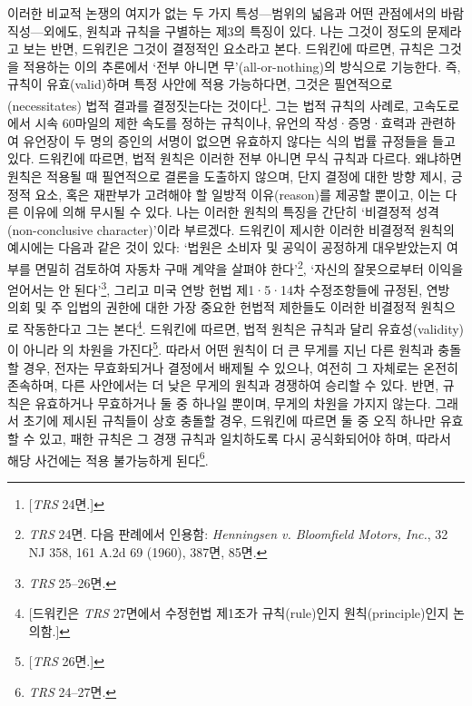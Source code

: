 이러한 비교적 논쟁의 여지가 없는 두 가지 특성---범위의 넓음과 어떤
관점에서의 바람직성---외에도, 원칙과 규칙을 구별하는 제3의 특징이 있다.
나는 그것이 정도의 문제라고 보는 반면, 드워킨은 그것이 결정적인 요소라고
본다. 드워킨에 따르면, 규칙은 그것을 적용하는 이의 추론에서 `전부 아니면
무'(all-or-nothing)의 방식으로 기능한다. 즉, 규칙이 유효(valid)하며 특정
사안에 적용 가능하다면, 그것은 필연적으로(necessitates) 법적 결과를
결정짓는다는 것이다\footnote{{[}\emph{TRS} 24면.{]}}. 그는 법적 규칙의
사례로, 고속도로에서 시속 60마일의 제한 속도를 정하는 규칙이나, 유언의
작성·증명·효력과 관련하여 유언장이 두 명의 증인의 서명이 없으면 유효하지
않다는 식의 법률 규정들을 들고 있다. 드워킨에 따르면, 법적 원칙은 이러한
전부 아니면 무식 규칙과 다르다. 왜냐하면 원칙은 적용될 때 필연적으로
결론을 도출하지 않으며, 단지 결정에 대한 방향 제시, 긍정적 요소, 혹은
재판부가 고려해야 할 일방적 이유(reason)를 제공할 뿐이고, 이는 다른
이유에 의해 무시될 수 있다. 나는 이러한 원칙의 특징을 간단히 `비결정적
성격(non-conclusive character)'이라 부르겠다. 드워킨이 제시한 이러한
비결정적 원칙의 예시에는 다음과 같은 것이 있다: `법원은 소비자 및 공익이
공정하게 대우받았는지 여부를 면밀히 검토하여 자동차 구매 계약을 살펴야
한다'\footnote{\emph{TRS} 24면. 다음 판례에서 인용함: \emph{Henningsen
  v. Bloomfield Motors, Inc.}, 32 NJ 358, 161 A.2d 69 (1960), 387면,
  85면.}, `자신의 잘못으로부터 이익을 얻어서는 안 된다'\footnote{\emph{TRS}
  25--26면.}, 그리고 미국 연방 헌법 제1·5·14차 수정조항들에 규정된, 연방
의회 및 주 입법의 권한에 대한 가장 중요한 헌법적 제한들도 이러한
비결정적 원칙으로 작동한다고 그는 본다\footnote{{[}드워킨은 \emph{TRS}
  27면에서 수정헌법 제1조가 규칙(rule)인지 원칙(principle)인지
  논의함.{]}}. 드워킨에 따르면, 법적 원칙은 규칙과 달리
유효성(validity)이 아니라 의 차원을
가진다\footnote{{[}\emph{TRS} 26면.{]}}. 따라서 어떤 원칙이 더 큰 무게를
지닌 다른 원칙과 충돌할 경우, 전자는 무효화되거나 결정에서 배제될 수
있으나, 여전히 그 자체로는 온전히 존속하며, 다른 사안에서는 더 낮은
무게의 원칙과 경쟁하여 승리할 수 있다. 반면, 규칙은 유효하거나
무효하거나 둘 중 하나일 뿐이며, 무게의 차원을 가지지 않는다. 그래서
초기에 제시된 규칙들이 상호 충돌할 경우, 드워킨에 따르면 둘 중 오직
하나만 유효할 수 있고, 패한 규칙은 그 경쟁 규칙과 일치하도록 다시
공식화되어야 하며, 따라서 해당 사건에는 적용 불가능하게 된다\footnote{\emph{TRS}
  24--27면.}.


